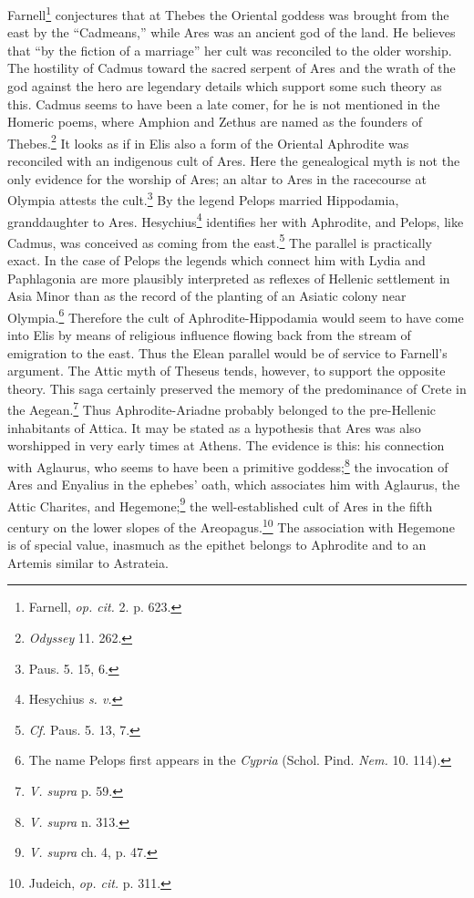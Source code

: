 \documentclass[a4paper, 12pt, oneside]{article}
\begin{document}
Farnell\footnote{Farnell, \emph{op. cit.} 2. p. 623.} conjectures that at Thebes the Oriental goddess was brought from the east by the ``Cadmeans,'' while Ares was an ancient god of the land. He believes that ``by the fiction of a marriage'' her cult was reconciled to the older worship. The hostility of Cadmus toward the sacred serpent of Ares and the wrath of the god against the hero are legendary details which support some such theory as this. Cadmus seems to have been a late comer, for he is not mentioned in the Homeric poems, where Amphion and Zethus are named as the founders of Thebes.\footnote{\emph{Odyssey} 11. 262.} It looks as if in Elis also a form of the Oriental Aphrodite was reconciled with an indigenous cult of Ares. Here the genealogical myth is not the only evidence for the worship of Ares; an altar to Ares in the racecourse at Olympia attests the cult.\footnote{Paus. 5. 15, 6.} By the legend Pelops married Hippodamia, granddaughter to Ares. Hesychius\footnote{Hesychius \emph{s. v.}} identifies her with Aphrodite, and Pelops, like Cadmus, was conceived as coming from the east.\footnote{\emph{Cf.} Paus. 5. 13, 7.} The parallel is practically exact. In the case of Pelops the legends which connect him with Lydia and Paphlagonia are more plausibly interpreted as reflexes of Hellenic settlement in Asia Minor than as the record of the planting of an Asiatic colony near Olympia.\footnote{The name Pelops first appears in the \emph{Cypria} (Schol. Pind. \emph{Nem.} 10. 114).} Therefore the cult of Aphrodite-Hippodamia would seem to have come into Elis by means of religious influence flowing back from the stream of emigration to the east. Thus the Elean parallel would be of service to Farnell's argument. The Attic myth of Theseus tends, however, to support the opposite theory. This saga certainly preserved the memory of the predominance of Crete in the Aegean.\footnote{\emph{V. supra} p. 59.} Thus Aphrodite-Ariadne probably belonged to the pre-Hellenic inhabitants of Attica. It may be stated as a hypothesis that Ares was also worshipped in very early times at Athens. The evidence is this: his connection with Aglaurus, who seems to have been a primitive goddess;\footnote{\emph{V. supra} n. 313.} the invocation of Ares and Enyalius in the ephebes' oath, which associates him with Aglaurus, the Attic Charites, and Hegemone;\footnote{\emph{V. supra} ch. 4, p. 47.} the well-established cult of Ares in the fifth century on the lower slopes of the Areopagus.\footnote{Judeich, \emph{op. cit.} p. 311.} The association with Hegemone is of special value, inasmuch as the epithet belongs to Aphrodite and to an Artemis similar to Astrateia.
\end{document}
